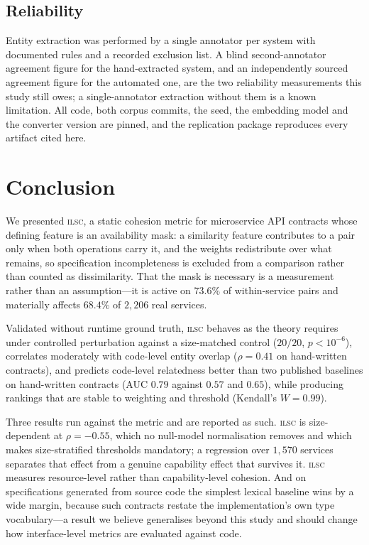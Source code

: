 \documentclass[journal]{IEEEtran}
\newcommand{\ilsc}{\textsc{ilsc}}
\begin{document}
\subsection{Reliability}
Entity extraction was performed by a single annotator per system with documented
rules and a recorded exclusion list. A blind second-annotator agreement figure
for the hand-extracted system, and an independently sourced agreement figure for
the automated one, are the two reliability measurements this study still owes; a
single-annotator extraction without them is a known limitation. All code,
both corpus commits, the seed, the embedding model and the converter version are
pinned, and the replication package reproduces every artifact cited here.

\section{Conclusion}
\label{sec:conclusion}
We presented \ilsc{}, a static cohesion metric for microservice API contracts
whose defining feature is an availability mask: a similarity feature contributes
to a pair only when both operations carry it, and the weights redistribute over
what remains, so specification incompleteness is excluded from a comparison
rather than counted as dissimilarity. That the mask is necessary is a
measurement rather than an assumption---it is active on $73.6\%$ of
within-service pairs and materially affects $68.4\%$ of $2{,}206$ real services.

Validated without runtime ground truth, \ilsc{} behaves as the theory requires
under controlled perturbation against a size-matched control ($20/20$,
$p<10^{-6}$), correlates moderately with code-level entity overlap
($\rho = 0.41$ on hand-written contracts), and predicts code-level relatedness
better than two published baselines on hand-written contracts (AUC $0.79$
against $0.57$ and $0.65$), while producing rankings that are stable to
weighting and threshold (Kendall's $W = 0.99$).

Three results run against the metric and are reported as such. \ilsc{} is
size-dependent at $\rho = -0.55$, which no null-model normalisation removes and
which makes size-stratified thresholds mandatory; a regression over $1{,}570$
services separates that effect from a genuine capability effect that survives
it. \ilsc{} measures resource-level rather than capability-level cohesion.
And on specifications generated from source code the simplest lexical baseline
wins by a wide margin, because such contracts restate the implementation's own
type vocabulary---a result we believe generalises beyond this study and should
change how interface-level metrics are evaluated against code.
\end{document}
